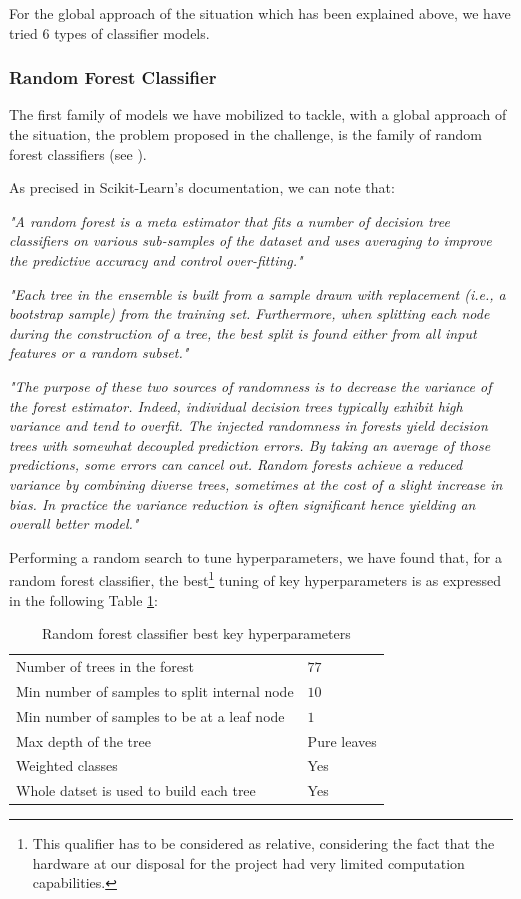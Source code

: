 \documentclass[twocolumn, switch]{article}
\begin{document}
For the global approach of the situation which has been explained above, we have tried $6$ types of classifier models.

\subsubsection{Random Forest Classifier}

The first family of models we have mobilized to tackle, with a global approach of the situation, the problem proposed in the challenge, is the family of random forest classifiers (see \cite{Ho_1995}).

As precised in Scikit-Learn's documentation, we can note that:

\textit{"A random forest is a meta estimator that fits a number of decision tree classifiers on various sub-samples of the dataset and uses averaging to improve the predictive accuracy and control over-fitting."}

\textit{"Each tree in the ensemble is built from a sample drawn with replacement (i.e., a bootstrap sample) from the training set. Furthermore, when splitting each node during the construction of a tree, the best split is found either from all input features or a random subset."}

\textit{"The purpose of these two sources of randomness is to decrease the variance of the forest estimator. Indeed, individual decision trees typically exhibit high variance and tend to overfit. The injected randomness in forests yield decision trees with somewhat decoupled prediction errors. By taking an average of those predictions, some errors can cancel out. Random forests achieve a reduced variance by combining diverse trees, sometimes at the cost of a slight increase in bias. In practice the variance reduction is often significant hence yielding an overall better model."}

Performing a random search to tune hyperparameters, we have found that, for a random forest classifier, the best\footnote{This qualifier has to be considered as relative, considering the fact that the hardware at our disposal for the project had very limited computation capabilities.} tuning of key hyperparameters is as expressed in the following Table \ref{tab:rfchyp}:

\begin{table}[H]
\caption{Random forest classifier best key hyperparameters}
\centering
\begin{tabular}{ll}
\toprule
Number of trees in the forest & $77$ \\
Min number of samples to split internal node & $10$ \\
Min number of samples to be at a leaf node & $1$ \\
Max depth of the tree & Pure leaves \\
Weighted classes & Yes \\
Whole datset is used to build each tree & Yes \\
\bottomrule
\end{tabular}
\label{tab:rfchyp}
\end{table}
\end{document}
